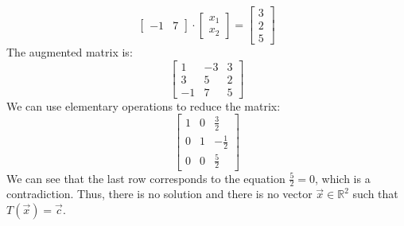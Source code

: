 \begin{eg}
\[\begin{bmatrix}
            -1 & 7
        \end{bmatrix} \cdot \begin{bmatrix} x_1 \\ x_2 \end{bmatrix} = \begin{bmatrix} 3 \\ 2 \\ 5 \end{bmatrix}
    \]
    The augmented matrix is:
    \[
        \begin{bmatrix}
            1 & -3 & 3 \\
            3 & 5 & 2 \\
            -1 & 7 & 5
        \end{bmatrix}
    \]
    We can use elementary operations to reduce the matrix:
    \[
        \begin{bmatrix}
            1 & 0 & \frac{3}{2} \\
            0 & 1 & -\frac{1}{2} \\
            0 & 0 & \frac{5}{2}
        \end{bmatrix}
    \]
    We can see that the last row corresponds to the equation $\frac{5}{2} = 0$, which is a contradiction. Thus, there is no solution and there is no vector $\vec{x} \in \mathbb{R}^2$ such that $T(\vec{x}) = \vec{c}$.
\end{eg}

